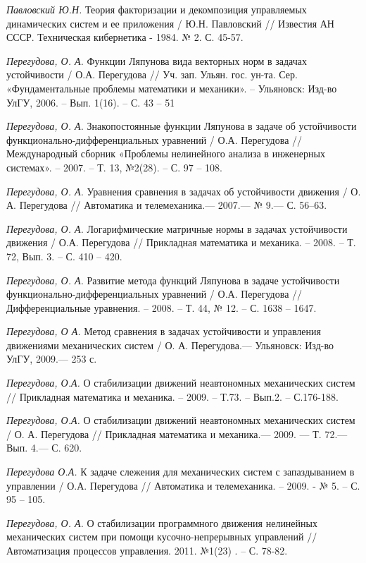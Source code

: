 \begin{thebibliography}{10}
	{\it Павловский Ю.Н.} Теория факторизации и декомпозиция управляемых динамических систем и ее приложения / Ю.Н. Павловский // Известия АН СССР. Техническая кибернетика - 1984. № 2. С. 45-57.
	
	{\it Перегудова, О. А.} Функции Ляпунова вида векторных норм в задачах устойчивости / О.А. Перегудова // Уч. зап. Ульян. гос. ун-та. Сер. 	«Фундаментальные проблемы математики и механики». – Ульяновск: Изд-во УлГУ, 2006. – Вып. 1(16). – С. 43 – 51
	
	{\it Перегудова, О. А.} Знакопостоянные функции Ляпунова в задаче об устойчивости функционально-дифференциальных уравнений / О.А. Перегудова // 	Международный сборник «Проблемы нелинейного анализа в инженерных системах». – 2007. – Т. 13, №2(28). – С. 97 – 108.

	{\it Перегудова, О. А.} Уравнения сравнения в задачах об устойчивости движения / О. А. Перегудова // Автоматика и телемеханика.—  2007.— № 9.— 		С. 56–63.
	
	{\it Перегудова, О. А.} Логарифмические матричные нормы в задачах устойчивости движения / О.А. Перегудова // Прикладная математика и механика. – 	2008. – Т. 72, Вып. 3. – С. 410 – 420.
	
	{\it Перегудова, О. А.} Развитие метода функций Ляпунова в задаче устойчивости функционально-дифференциальных уравнений / О.А. Перегудова // 		Дифференциальные уравнения. – 2008. – Т. 44, № 12. – С. 1638 – 1647.

	{\it Перегудова, О А.} Метод сравнения в задачах устойчивости и управления движениями
	механических систем / О. А. Перегудова.— Ульяновск: Изд-во УлГУ, 2009.— 253 с.

	{\it Перегудова, О.А.} О стабилизации движений неавтономных механических систем // Прикладная математика и механика. – 2009. – Т.73. – Вып.2. – 	С.176-188.

	{\it Перегудова, О.А.} О стабилизации движений неавтономных механических систем / О. А. Перегудова // Прикладная математика и механика.—  2009.	— Т. 72.— Вып. 4.— С. 620.
	
	{\it Перегудова О.А.} К задаче слежения для механических систем с запаздыванием в управлении / О.А. Перегудова // Автоматика и телемеханика. –  	2009. - № 5. – С. 95 – 105.
	
	{\it Перегудова, О. А.} О стабилизации программного движения нелинейных механических систем при помощи кусочно-непрерывных управлений // 		Автоматизация процессов управления. 2011. №1(23) . – С. 78-82.
	

\end{thebibliography}
